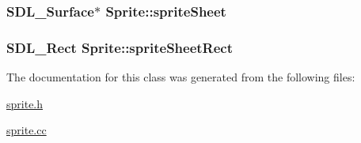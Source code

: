 \hypertarget{classSprite_aa356e52e44c86d8d76cc3060eb41ae06}{
\subsubsection[{sprite\-Sheet}]{\setlength{\rightskip}{0pt plus 5cm}S\-D\-L\-\_\-\-Surface$\ast$ Sprite\-::sprite\-Sheet\hspace{0.3cm}{\ttfamily [protected]}}}\label{classSprite_aa356e52e44c86d8d76cc3060eb41ae06}
\hypertarget{classSprite_aac23050a3e3383f85f3cabbb874ff890}{
\subsubsection[{sprite\-Sheet\-Rect}]{\setlength{\rightskip}{0pt plus 5cm}S\-D\-L\-\_\-\-Rect Sprite\-::sprite\-Sheet\-Rect\hspace{0.3cm}{\ttfamily [protected]}}}\label{classSprite_aac23050a3e3383f85f3cabbb874ff890}


The documentation for this class was generated from the following files\-:\begin{DoxyCompactItemize}
\item 
\hyperlink{sprite_8h}{sprite.\-h}\item 
\hyperlink{sprite_8cc}{sprite.\-cc}\end{DoxyCompactItemize}
